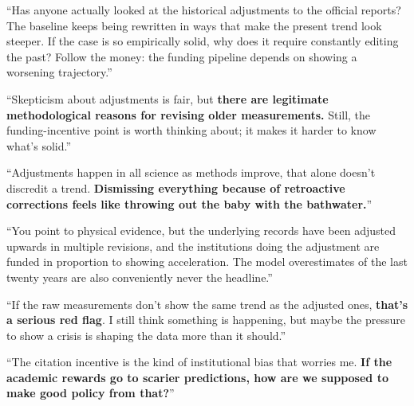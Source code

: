 \begin{casebox}



\textcolor{malRed}{``Has anyone actually looked at the historical adjustments to the official reports? The baseline keeps being rewritten in ways that make the present trend look steeper. If the case is so empirically solid, why does it require constantly editing the past? Follow the money: the funding pipeline depends on showing a worsening trajectory.''}

``Skepticism about adjustments is fair, but \textbf{there are legitimate methodological reasons for revising older measurements.} Still, the funding-incentive point is worth thinking about; it makes it harder to know what's solid.''

``Adjustments happen in all science as methods improve, that alone doesn't discredit a trend. \textbf{Dismissing everything because of retroactive corrections feels like throwing out the baby with the bathwater.}''


\textcolor{malRed}{``You point to physical evidence, but the underlying records have been adjusted upwards in multiple revisions, and the institutions doing the adjustment are funded in proportion to showing acceleration. The model overestimates of the last twenty years are also conveniently never the headline.''}

``If the raw measurements don't show the same trend as the adjusted ones, \textbf{that's a serious red flag}. I still think something is happening, but maybe the pressure to show a crisis is shaping the data more than it should.''

``The citation incentive is the kind of institutional bias that worries me. \textbf{If the academic rewards go to scarier predictions, how are we supposed to make good policy from that?}''



\end{casebox}

